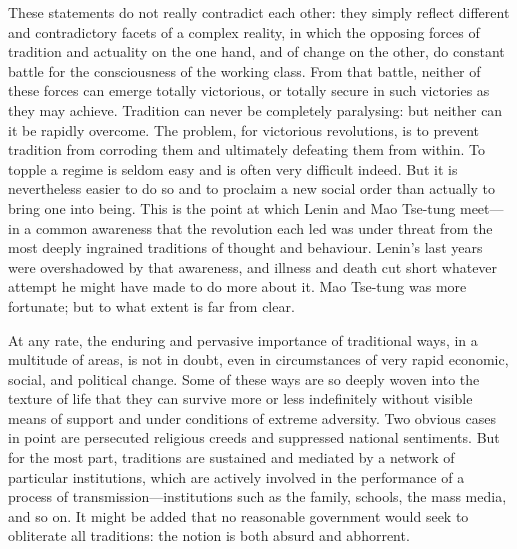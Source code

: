 These statements do not really contradict each other: they simply reflect different and contradictory facets of a complex reality, in which the opposing forces of tradition and actuality on the one hand, and of change on the other, do constant battle for the consciousness of the working class. From that battle, neither of these forces can emerge totally victorious, or totally secure in such victories as they may achieve. Tradition can never be completely paralysing: but neither can it be rapidly overcome. The problem, for victorious revolutions, is to prevent tradition from corroding them and ultimately defeating them from within. To topple a regime is seldom easy and is often very difficult indeed. But it is nevertheless easier to do so and to proclaim a new social order than actually to bring one into being. This is the point at which Lenin and Mao Tse-tung meet—in a common awareness that the revolution each led was under threat from the most deeply ingrained traditions of thought and behaviour. Lenin's last years were overshadowed by that awareness, and illness and death cut short whatever attempt he might have made to do more about it. Mao Tse-tung was more fortunate; but to what extent is far from clear.

At any rate, the enduring and pervasive importance of traditional ways, in a multitude of areas, is not in doubt, even in circumstances of very rapid economic, social, and political change. Some of these ways are so deeply woven into the texture of life that they can survive more or less indefinitely without visible means of support and under conditions of extreme adversity. Two obvious cases in point are persecuted religious creeds and suppressed national sentiments. But for the most part, traditions are sustained and mediated by a network of particular institutions, which are actively involved in the performance of a process of transmission—institutions such as the family, schools, the mass media, and so on. It might be added that no reasonable government would seek to obliterate all traditions: the notion is both absurd and abhorrent.

